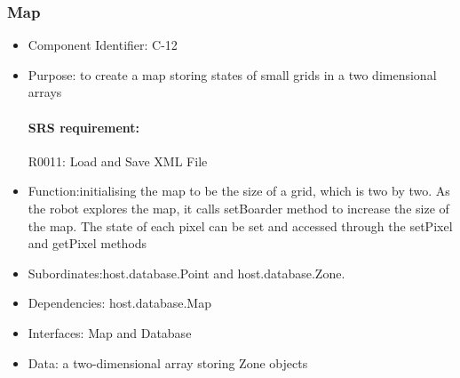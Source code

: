 \documentclass[11pt, a4paper]{report}
\begin{document}
\subsubsection{Map}
\begin{itemize}
\item Component Identifier: C-12
\item Purpose: to create a map storing states of small grids in a two dimensional arrays
\paragraph{SRS requirement:} R0011: Load and Save XML File
\item Function:initialising the map to be the size of a grid, which is two by two. As the robot
 explores the map, it calls setBoarder method to increase the size of the map. The state of each
 pixel can be set and accessed through the setPixel and getPixel methods
 
\item Subordinates:host.database.Point and host.database.Zone.
\item Dependencies: host.database.Map
\item Interfaces: Map and Database
\item Data: a two-dimensional array storing Zone objects
\end{itemize}

\end{document}
